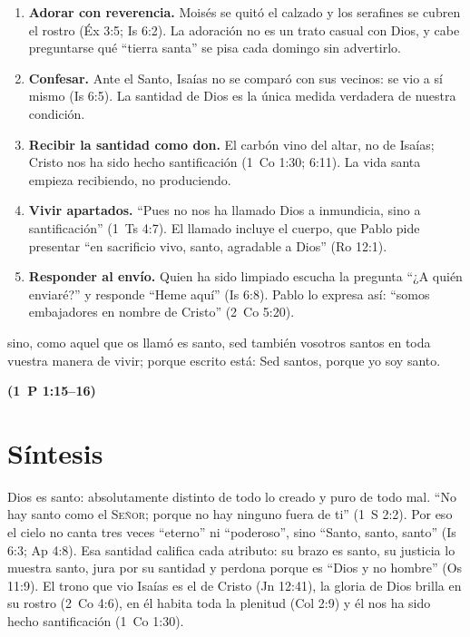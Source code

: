 \documentclass[11pt,letterpaper]{article}
\newcommand{\SENOR}{\textsc{Señor}}
\newcommand{\fuente}[1]{\par\hfill{\upshape\bfseries\small\textcolor{azul}{#1}}}
\begin{document}
\begin{enumerate}
\item \textbf{Adorar con reverencia.} Moisés se quitó el calzado y los serafines se cubren el rostro (Éx 3:5; Is 6:2). La adoración no es un trato casual con Dios, y cabe preguntarse qué ``tierra santa'' se pisa cada domingo sin advertirlo.
\item \textbf{Confesar.} Ante el Santo, Isaías no se comparó con sus vecinos: se vio a sí mismo (Is 6:5). La santidad de Dios es la única medida verdadera de nuestra condición.
\item \textbf{Recibir la santidad como don.} El carbón vino del altar, no de Isaías; Cristo nos ha sido hecho santificación (1~Co 1:30; 6:11). La vida santa empieza recibiendo, no produciendo.
\item \textbf{Vivir apartados.} ``Pues no nos ha llamado Dios a inmundicia, sino a santificación'' (1~Ts 4:7). El llamado incluye el cuerpo, que Pablo pide presentar ``en sacrificio vivo, santo, agradable a Dios'' (Ro 12:1).
\item \textbf{Responder al envío.} Quien ha sido limpiado escucha la pregunta ``¿A quién enviaré?'' y responde ``Heme aquí'' (Is 6:8). Pablo lo expresa así: ``somos embajadores en nombre de Cristo'' (2~Co 5:20).
\end{enumerate}

\begin{cita}sino, como aquel que os llamó es santo, sed también vosotros santos en toda vuestra manera de vivir; porque escrito está: Sed santos, porque yo soy santo.\fuente{(1~P 1:15--16)}\end{cita}

\section{Síntesis}

\begin{tcolorbox}[colback=papiro,colframe=azul,boxrule=1pt,arc=3pt]
Dios es santo: absolutamente distinto de todo lo creado y puro de todo mal. ``No hay santo como el \SENOR; porque no hay ninguno fuera de ti'' (1~S 2:2). Por eso el cielo no canta tres veces ``eterno'' ni ``poderoso'', sino ``Santo, santo, santo'' (Is 6:3; Ap 4:8). Esa santidad califica cada atributo: su brazo es santo, su justicia lo muestra santo, jura por su santidad y perdona porque es ``Dios y no hombre'' (Os 11:9). El trono que vio Isaías es el de Cristo (Jn 12:41), la gloria de Dios brilla en su rostro (2~Co 4:6), en él habita toda la plenitud (Col 2:9) y él nos ha sido hecho santificación (1~Co 1:30).
\end{tcolorbox}
\end{document}
